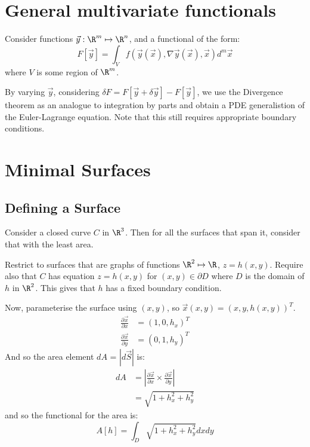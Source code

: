 \documentclass[../Main.tex]{subfiles}
\begin{document}
\section{General multivariate functionals}
Consider functions $\vec{y} : \R^m \mapsto \R^n$, and a functional of the form:
\begin{equation*}
    F[\vec{y}] = \int_V f(\vec{y}(\vec{x}), \nabla \vec{y} (\vec{x}), \vec{x})d^m \vec{x}
\end{equation*}
where $V$ is some region of $\R^m$.

By varying $\vec{y}$, considering $\delta F = F[\vec{y} + \delta \vec{y}] - F[\vec{y}]$, we use the Divergence theorem as an analogue to integration by parts and obtain a PDE generalistion of the Euler-Lagrange equation. Note that this still requires appropriate boundary conditions.
\section{Minimal Surfaces}
\subsection{Defining a Surface}
Consider a closed curve $C$ in $\R^3$. Then for all the surfaces that span it, consider that with the least area.

Restrict to surfaces that are graphs of functions $\R^2 \mapsto \R$, $z = h(x, y)$. Require also that $C$ has equation $z = h(x, y)$ for $(x, y) \in \partial D$ where $D$ is the domain of $h$ in $\R^2$. This gives that $h$ has a fixed boundary condition.

Now, parameterise the surface using $(x, y)$, so $\vec{x}(x, y) = (x, y, h(x, y))^T$.
\begin{align*}
    \frac{\partial \vec{x}}{\partial x} &= (1, 0, h_x)^T \\
    \frac{\partial \vec{x}}{\partial y} &= (0, 1, h_y)^T
\end{align*}
And so the area element $dA$ = $|d\vec{S}|$ is:
\begin{align*}
    dA &= \left|\frac{\partial \vec{x}}{\partial x} \times \frac{\partial \vec{x}}{\partial y} \right| \\
    &= \sqrt{1 + h_x^2 + h_y^2}
\end{align*}
and so the functional for the area is:
\begin{equation*}
    A[h] = \int_D \sqrt{1 + h_x^2 + h_y^2} dx dy
\end{equation*}
\end{document}
